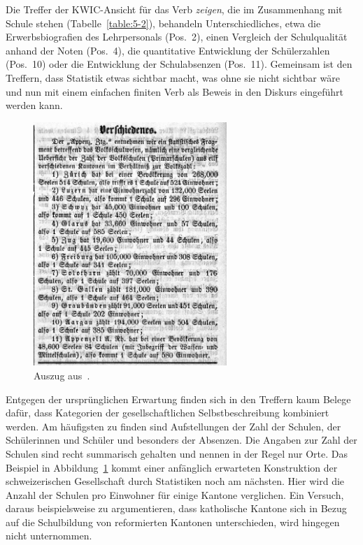 Die Treffer der KWIC-Ansicht für das Verb \textit{zeigen}, die im Zusammenhang mit Schule stehen (Tabelle~\ref{table:5-2}), behandeln Unterschiedliches, etwa die Erwerbsbiografien des Lehrpersonals (Pos.~2), einen Vergleich der Schulqualität anhand der Noten (Pos.~4), die quantitative Entwicklung der Schülerzahlen (Pos.~10) oder die Entwicklung der Schulabsenzen (Pos.~11). Gemeinsam ist den Treffern, dass Statistik etwas sichtbar macht, was ohne sie nicht sichtbar wäre und nun mit einem einfachen finiten Verb als Beweis in den Diskurs eingeführt werden kann. 

\begin{figure}[!ht]
    \centering
    \includegraphics[width=0.65\textwidth]{Figures/bso-001_1864_007_141_144_e38_s144.jpg}
    \caption{Auszug aus~\cite{noauthor_verschiedenes_1864}.}
    \label{figure:5-4}
\end{figure}

Entgegen der ursprünglichen Erwartung finden sich in den Treffern kaum Belege dafür, dass Kategorien der gesellschaftlichen Selbstbeschreibung kombiniert werden. Am häufigsten zu finden sind Aufstellungen der Zahl der Schulen, der Schülerinnen und Schüler und besonders der Absenzen. Die Angaben zur Zahl der Schulen sind recht summarisch gehalten und nennen in der Regel nur Orte. Das Beispiel in Abbildung~\ref{figure:5-4} kommt einer anfänglich erwarteten Konstruktion der schweizerischen Gesellschaft durch Statistiken noch am nächsten. Hier wird die Anzahl der Schulen pro Einwohner für einige Kantone verglichen. Ein Versuch, daraus beispielsweise zu argumentieren, dass katholische Kantone sich in Bezug auf die Schulbildung von reformierten Kantonen unterschieden, wird hingegen nicht unternommen.


